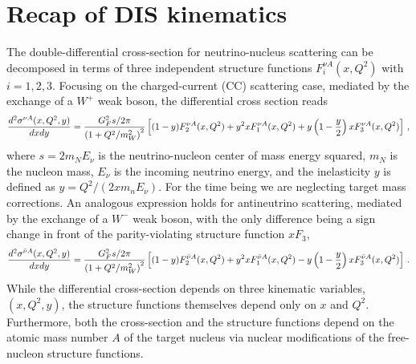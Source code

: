 \documentclass[11pt,a4paper]{article}
\newcommand{\be}{\begin{equation}}
\newcommand{\ee}{\end{equation}}
\newcommand{\lc}{\left[}
\newcommand{\rc}{\right]}
\newcommand{\lp}{\left(}
\newcommand{\rp}{\right)}
\def\frac#1#2{{{#1}\over {#2}}}
\numberwithin{equation}{section}
\numberwithin{figure}{section}
\numberwithin{table}{section}
\begin{document}
\tableofcontents

\section{Recap of DIS kinematics}

The double-differential cross-section for neutrino-nucleus scattering
can be decomposed
in terms of three independent structure functions $F_i^{\nu A}(x,Q^2)$ with $i=1,2,3$.
%
Focusing on the charged-current (CC) scattering case, mediated
by the exchange of a $W^+$ weak boson, the differential
 cross section reads
\be
\label{eq:neutrino_DIS_xsec}
\frac{d^2\sigma^{\nu A}(x,Q^2,y)}{dxdy} =  \frac{G_F^2s/2\pi}{\lp 1+Q^2/m_W^2\rp^2}\lc (1-y)F^{\nu A}_2(x,Q^2) + y^2xF^{\nu A}_1(x,Q^2) + y\lp 1-\frac{y}{2}\rp xF^{\nu A}_3(x,Q^2)\rc  \, ,
\ee
where $s=2m_N E_\nu$ is the neutrino-nucleon center of mass energy squared, $m_N$ is the nucleon mass,
$E_\nu$ is the incoming neutrino energy,
and the inelasticity $y$ is defined as $y=Q^2/(2x m_n E_{\nu})$.
%
For the time being we are neglecting target mass 
corrections.
%
An analogous expression holds for  antineutrino 
scattering, mediated
by the exchange of a $W^-$ weak boson, with the only difference being a sign change
in front of the parity-violating structure function $xF_3$,
\be
\label{eq:antineutrino_DIS_xsec}
\frac{d^2\sigma^{\bar{\nu} A}(x,Q^2,y)}{dxdy} =  \frac{G_F^2s/2\pi}{\lp 1+Q^2/m_W^2\rp^2}\lc (1-y)F^{\bar{\nu} A}_2(x,Q^2) + y^2xF^{\bar{\nu} A}_1(x,Q^2) - y\lp 1-\frac{y}{2}\rp xF^{\bar{\nu} A}_3(x,Q^2)\rc  \, .
\ee
While the differential cross-section depends on three kinematic variables, $(x,Q^2,y)$,
the structure functions themselves depend only on $x$ and $Q^2$.
%
Furthermore, both the cross-section and the structure functions depend
on the atomic mass number $A$ of the target nucleus via nuclear modifications of the free-nucleon
structure functions.
\end{document}
